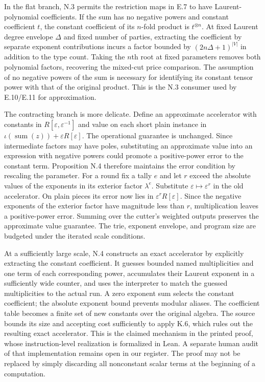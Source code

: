 \documentclass[11pt,letterpaper]{article}
\theoremstyle{definition}\newtheorem{definition}[theorem]{Definition}\newtheorem{example}[theorem]{Example}
\theoremstyle{remark}\newtheorem{remark}[theorem]{Remark}
\begin{document}
In the flat branch, N.3 permits the restriction maps in E.7 to have Laurent-polynomial coefficients. If the sum has no negative powers and constant coefficient $t$, the constant coefficient of its $n$-fold product is $t^{\otimes n}$. At fixed Laurent degree envelope $\Delta$ and fixed number of parties, extracting the coefficient by separate exponent contributions incurs a factor bounded by $(2n\Delta+1)^{|V|}$ in addition to the type count. Taking the $n$th root at fixed parameters removes both polynomial factors, recovering the mixed-cut price comparison. The assumption of no negative powers of the sum is necessary for identifying its constant tensor power with that of the original product. This is the N.3 consumer used by E.10/E.11 for approximation.

The contracting branch is more delicate. Define an approximate accelerator with constants in $R[\varepsilon,\varepsilon^{-1}]$ and value on each short plain instance in $\iota(\operatorname{sum}(z))+\varepsilon R[\varepsilon]$. The operational guarantee is unchanged. Since intermediate factors may have poles, substituting an approximate value into an expression with negative powers could promote a positive-power error to the constant term. Proposition N.4 therefore maintains the error condition by rescaling the parameter. For a round fix a tally $e$ and let $r$ exceed the absolute values of the exponents in its exterior factor $\lambda^e$. Substitute $\varepsilon\mapsto\varepsilon^r$ in the old accelerator. On plain pieces its error now lies in $\varepsilon^rR[\varepsilon]$. Since the negative exponents of the exterior factor have magnitude less than $r$, multiplication leaves a positive-power error. Summing over the cutter's weighted outputs preserves the approximate value guarantee. The trie, exponent envelope, and program size are budgeted under the iterated scale conditions.

At a sufficiently large scale, N.4 constructs an exact accelerator by explicitly extracting the constant coefficient. It guesses bounded named multiplicities and one term of each corresponding power, accumulates their Laurent exponent in a sufficiently wide counter, and uses the interpreter to match the guessed multiplicities to the actual run. A zero exponent sum selects the constant coefficient; the absolute exponent bound prevents modular aliases. The coefficient table becomes a finite set of new constants over the original algebra. The source bounds its size and accepting cost sufficiently to apply K.6, which rules out the resulting exact accelerator. This is the claimed mechanism in the printed proof, whose instruction-level realization is formalized in Lean. A separate human audit of that implementation remains open in our register. The proof may not be replaced by simply discarding all nonconstant scalar terms at the beginning of a computation.
\end{document}
